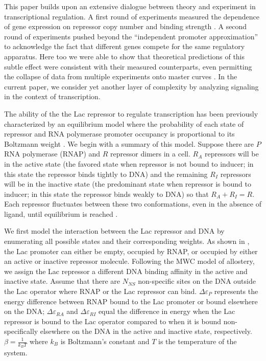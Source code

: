 This paper builds upon an extensive dialogue between theory and experiment in
transcriptional regulation.  A first round of experiments measured the dependence
of gene expression on repressor copy number and binding strength
\cite{Garcia2011}.  A second round of experiments pushed beyond the ``independent
promoter approximation'' to acknowledge the fact that different genes compete
for the same regulatory apparatus.  Here too we were able to show that
theoretical predictions of this subtle effect were consistent with their
measured counterparts, even permitting the collapse of data from multiple
experiments onto master curves \cite{Brewster2014, Weinert2014}. In the current
paper, we consider yet another layer of complexity by analyzing signaling in the
context of transcription.

The ability of the the Lac repressor to regulate transcription has been
previously characterized by an equilibrium model where the probability of each
state of repressor and RNA polymerase promoter occupancy is proportional to its
Boltzmann weight \cite{Daber2011a, Phillips2015a}. We begin with a summary of
this model. Suppose there are \(P\) RNA polymerase (RNAP) and \(R\) repressor
dimers in a cell. \(R_A\) repressors will be in the active state (the favored
state when repressor is not bound to inducer; in this state the repressor binds
tightly to DNA) and the remaining \(R_I\) repressors will be in the inactive
state (the predominant state when repressor is bound to inducer; in this state
the repressor binds weakly to DNA) so that \(R_A+R_I=R\). Each repressor
fluctuates between these two conformations, even in the absence of ligand, until
equilibrium is reached \cite{Kern2003}.

We first model the interaction between the Lac repressor and DNA by enumerating
all possible states and their corresponding weights. As shown in
\fref[figpolymeraseRepressorStates], the Lac promoter can either be empty,
occupied by RNAP, or occupied by either an active or inactive repressor
molecule. Following the MWC model of allostery, we assign the Lac repressor a
different DNA binding affinity in the active and inactive state. Assume that
there are $N_{NS}$ non-specific sites on the DNA outside the Lac operator where
RNAP or the Lac repressor can bind. \(\Delta\varepsilon_{P}\) represents the
energy difference between RNAP bound to the Lac promoter or bound elsewhere on
the DNA; \(\Delta\varepsilon_{RA}\) and \(\Delta\varepsilon_{RI}\) equal the
difference in energy when the Lac repressor is bound to the Lac operator
compared to when it is bound non-specifically elsewhere on the DNA in the active
and inactive state, respectively. $\beta = \frac{1}{k_BT}$ where $k_B$ is
Boltzmann's constant and $T$ is the temperature of the system.


